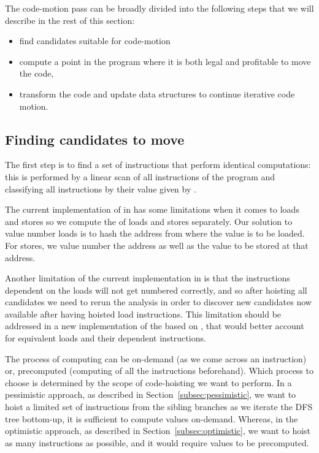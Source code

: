 \documentclass{sig-alternate}
\begin{document}
The code-motion pass can be broadly divided into the following steps that we will
describe in the rest of this section:
\begin{itemize}
\item find candidates suitable for code-motion
\item compute a point in the program where it is both legal and profitable to
  move the code,
\item transform the code and update data structures to continue iterative code
  motion.
\end{itemize}

\subsection{Finding candidates to move}
The first step is to find a set of instructions that perform identical
computations: this is performed by a linear scan of all instructions of the
program and classifying all instructions by their value given by \GVN{}.

The current implementation of \GVN{} in \LLVM{} has some limitations when it
comes to loads and stores so we compute the \GVN{} of loads and stores
separately.  Our solution to value number loads is to hash the address from
where the value is to be loaded. For stores, we value number the address as well
as the value to be stored at that address.

Another limitation of the current \GVN{} implementation in \LLVM{} is that the
instructions dependent on the loads will not get numbered correctly, and so
after hoisting all candidates we need to rerun the \GVN{} analysis in order to
discover new candidates now available after having hoisted load instructions.
This limitation should be addressed in a new implementation of the \GVN{} based on
\MemorySSA{}, that would better account for equivalent loads and their dependent
instructions.

The process of computing \GVN{} can be on-demand (as we come across an instruction)
or, precomputed (computing \GVN{} of all the instructions beforehand). Which
process to choose is determined by the scope of code-hoisting we want to
perform. In a pessimistic approach, as described in
Section~\ref{subsec:pessimistic}, we want to hoist a limited set of instructions
from the sibling branches as we iterate the DFS tree bottom-up, it is sufficient
to compute \GVN{} values on-demand. Whereas, in the optimistic approach, as
described in Section~\ref{subsec:optimistic}, we want to hoist as many
instructions as possible, and it would require \GVN{} values to be precomputed.
\end{document}
